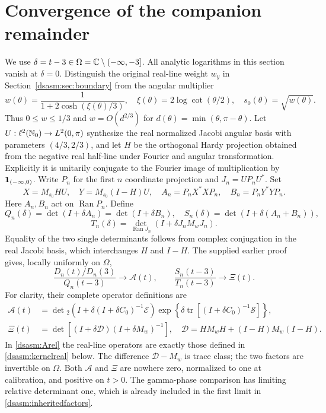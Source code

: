 \documentclass[11pt,letterpaper]{article}
\theoremstyle{remark}\newtheorem{remark}[theorem]{Remark}
\DeclareMathOperator{\tr}{tr}\DeclareMathOperator{\Ran}{Ran}
\begin{document}
\section{Convergence of the companion remainder}\label{dsasm:sec:companion}
We use $\delta=t-3\in\Omega=\mathbb C\setminus(-\infty,-3]$.
All analytic logarithms in this section vanish at $\delta=0$.
Distinguish the original real-line weight $w_y$ in
Section~\ref{dsasm:sec:boundary} from the angular multiplier
\begin{equation}\label{dsasm:wang}
 w(\theta)=\frac1{1+2\cosh(\xi(\theta)/3)},\quad
 \xi(\theta)=2\log\cot(\theta/2),\quad s_0(\theta)=\sqrt{w(\theta)}.
\end{equation}
Thus $0\le w\le1/3$ and $w=O(d^{2/3})$ for
$d(\theta)=\min(\theta,\pi-\theta)$.
Let $U:\ell^2(\mathbb N_0)\to L^2(0,\pi)$ synthesize the real normalized
Jacobi angular basis with parameters $(4/3,2/3)$, and let $H$ be the
orthogonal Hardy projection obtained from the negative real half-line
under Fourier and angular transformation. Explicitly it is unitarily
conjugate to the Fourier image of multiplication by $\mathbf1_{(-\infty,0)}$.
Write $P_n$ for the first $n$ coordinate projection and $J_n=UP_nU^*$.
Set
\[
 X=M_{s_0}HU,\quad Y=M_{s_0}(I-H)U,\quad
 A_n=P_nX^*XP_n,\quad B_n=P_nY^*YP_n.
\]
Here $A_n,B_n$ act on $\Ran P_n$. Define
\[
 Q_n(\delta)=\det(I+\delta A_n)=\det(I+\delta B_n),\quad
 S_n(\delta)=\det(I+\delta(A_n+B_n)),
\]
\[
 T_n(\delta)=\det_{\Ran J_n}(I+\delta J_nM_wJ_n).
\]
Equality of the two single determinants follows from complex
conjugation in the real Jacobi basis, which interchanges $H$ and $I-H$.
The supplied earlier proof gives, locally uniformly on $\Omega$,
\begin{equation}\label{dsasm:inheritedfactors}
 \frac{D_n(t)/D_n(3)}{Q_n(t-3)}\longrightarrow\mathcal A(t),
 \qquad \frac{S_n(t-3)}{T_n(t-3)}\longrightarrow\Xi(t).
\end{equation}
For clarity, their complete operator definitions are
\begin{align}
 \mathcal A(t)&=\det{}_2\!\left(I+\delta(I+\delta C_0)^{-1}\mathcal E\right)
 \exp\!\left\{\delta\tr[(I+\delta C_0)^{-1}\mathcal S]\right\},
 \label{dsasm:Arel}\\
 \Xi(t)&=\det\!\left[(I+\delta\mathcal D)(I+\delta M_w)^{-1}\right],
 \quad \mathcal D=HM_wH+(I-H)M_w(I-H).
 \label{dsasm:Xidef}
\end{align}
In \eqref{dsasm:Arel} the real-line operators are exactly those defined in
\eqref{dsasm:kernelreal} below. The difference $\mathcal D-M_w$ is trace
class; the two factors are invertible on $\Omega$. Both $\mathcal A$
and $\Xi$ are nowhere zero, normalized to one at calibration, and
positive on $t>0$. The gamma-phase comparison has limiting relative
determinant one, which is already included in the first limit in
\eqref{dsasm:inheritedfactors}.
\end{document}
